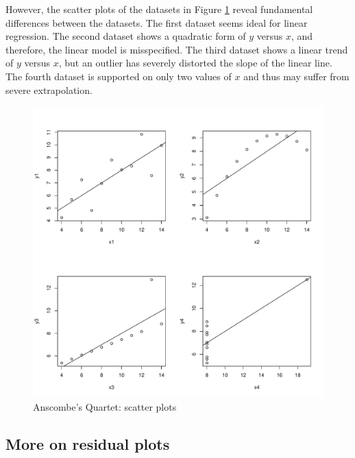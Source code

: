 However, the scatter plots of the datasets in Figure \ref{fig::AnscombeQuartetplots} reveal fundamental differences between the datasets. The first dataset seems ideal for linear regression. The second dataset shows a quadratic form of $y$ versus $x$, and therefore, the linear model is misspecified. The third dataset shows a linear trend of $y$ versus $x$, but an outlier has severely distorted the slope of the linear line. The fourth dataset is supported on only two values of $x$ and thus may suffer from severe extrapolation. 





\begin{figure}[th]
\centering
\includegraphics[width = \textwidth]{figures/AnscombeQuartet.pdf}
\caption{Anscombe's Quartet: scatter plots}\label{fig::AnscombeQuartetplots}
\end{figure}






\subsection{More on residual plots}
\label{sec::residual-plot}




